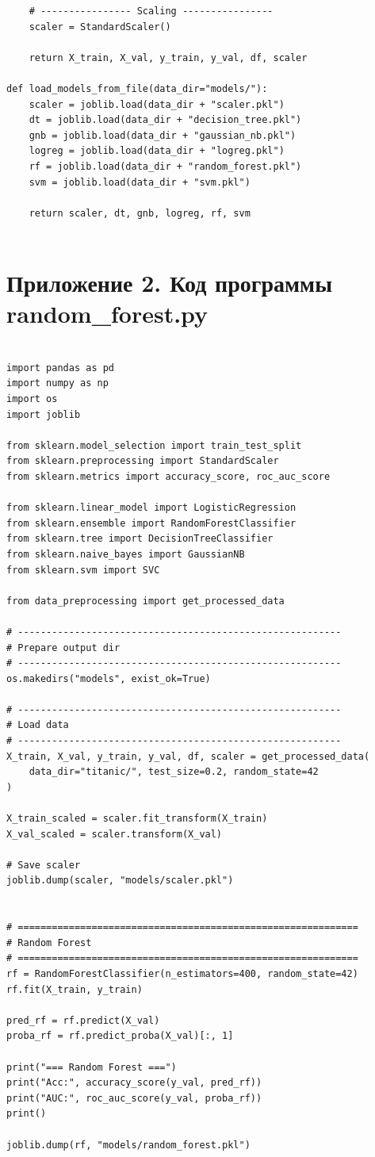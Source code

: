 \documentclass[14pt,a4paper]{extarticle}
\begin{document}
\begin{verbatim}
    # ---------------- Scaling ----------------
    scaler = StandardScaler()

    return X_train, X_val, y_train, y_val, df, scaler

def load_models_from_file(data_dir="models/"):
    scaler = joblib.load(data_dir + "scaler.pkl")
    dt = joblib.load(data_dir + "decision_tree.pkl")
    gnb = joblib.load(data_dir + "gaussian_nb.pkl")
    logreg = joblib.load(data_dir + "logreg.pkl")
    rf = joblib.load(data_dir + "random_forest.pkl")
    svm = joblib.load(data_dir + "svm.pkl")

    return scaler, dt, gnb, logreg, rf, svm


\end{verbatim}

\section*{Приложение 2. Код программы random\_forest.py}

\begin{verbatim}

import pandas as pd
import numpy as np
import os
import joblib

from sklearn.model_selection import train_test_split
from sklearn.preprocessing import StandardScaler
from sklearn.metrics import accuracy_score, roc_auc_score

from sklearn.linear_model import LogisticRegression
from sklearn.ensemble import RandomForestClassifier
from sklearn.tree import DecisionTreeClassifier
from sklearn.naive_bayes import GaussianNB
from sklearn.svm import SVC

from data_preprocessing import get_processed_data

# ---------------------------------------------------------
# Prepare output dir
# ---------------------------------------------------------
os.makedirs("models", exist_ok=True)

# ---------------------------------------------------------
# Load data
# ---------------------------------------------------------
X_train, X_val, y_train, y_val, df, scaler = get_processed_data(
    data_dir="titanic/", test_size=0.2, random_state=42
)

X_train_scaled = scaler.fit_transform(X_train)
X_val_scaled = scaler.transform(X_val)

# Save scaler
joblib.dump(scaler, "models/scaler.pkl")


# ============================================================
# Random Forest
# ============================================================
rf = RandomForestClassifier(n_estimators=400, random_state=42)
rf.fit(X_train, y_train)

pred_rf = rf.predict(X_val)
proba_rf = rf.predict_proba(X_val)[:, 1]

print("=== Random Forest ===")
print("Acc:", accuracy_score(y_val, pred_rf))
print("AUC:", roc_auc_score(y_val, proba_rf))
print()

joblib.dump(rf, "models/random_forest.pkl")


\end{verbatim}
\end{document}
